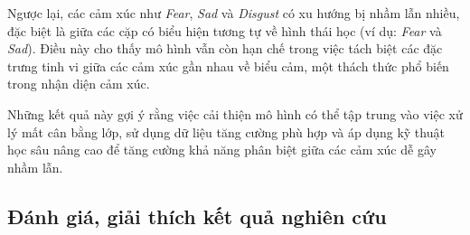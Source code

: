 Ngược lại, các cảm xúc như \textit{Fear}, \textit{Sad} và \textit{Disgust} có xu hướng bị nhầm lẫn nhiều, đặc biệt là giữa các cặp có biểu hiện tương tự về hình thái học (ví dụ: \textit{Fear} và \textit{Sad}). Điều này cho thấy mô hình vẫn còn hạn chế trong việc tách biệt các đặc trưng tinh vi giữa các cảm xúc gần nhau về biểu cảm, một thách thức phổ biến trong nhận diện cảm xúc.

Những kết quả này gợi ý rằng việc cải thiện mô hình có thể tập trung vào việc xử lý mất cân bằng lớp, sử dụng dữ liệu tăng cường phù hợp và áp dụng kỹ thuật học sâu nâng cao để tăng cường khả năng phân biệt giữa các cảm xúc dễ gây nhầm lẫn.







\subsection{Đánh giá, giải thích kết quả nghiên cứu}

